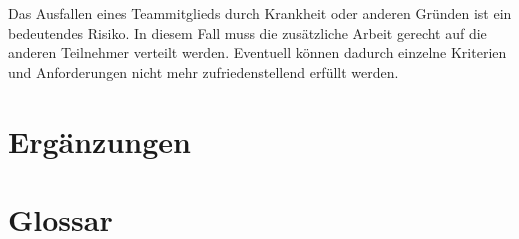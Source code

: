 \documentclass[parskip=full]{scrartcl}
\begin{document}
Das Ausfallen eines Teammitglieds durch Krankheit oder anderen Gründen ist ein bedeutendes Risiko. In diesem Fall muss die zusätzliche Arbeit gerecht auf die anderen Teilnehmer verteilt werden. Eventuell können dadurch einzelne Kriterien und Anforderungen nicht mehr zufriedenstellend erfüllt werden.

\section{Ergänzungen}\label{erweiterung}

\section{Glossar}\label{glossar}

\renewcommand*{\glossarysection}[2][]{}	%
\printnoidxglossaries				%
\end{document}
